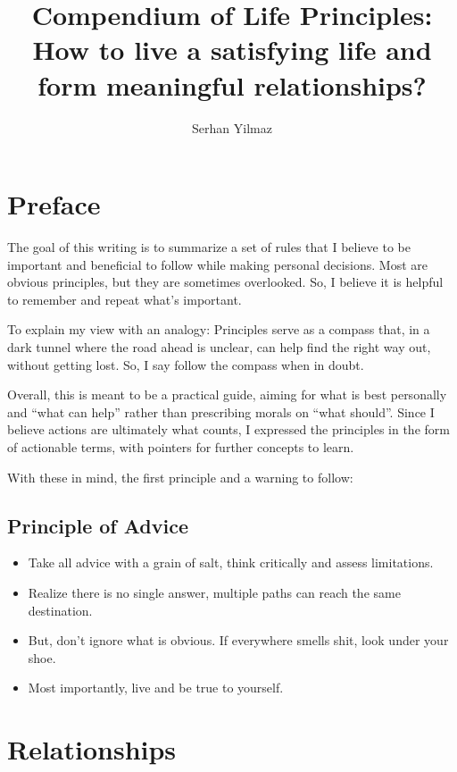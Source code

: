 \documentclass[
]{book}
\title{Compendium of Life Principles: How to live a satisfying life and form meaningful relationships?}
\author{Serhan Yilmaz}
\date{}
\providecommand{\tightlist}{%
  \setlength{\itemsep}{0pt}\setlength{\parskip}{0pt}}
\begin{document}
\maketitle

{
\setcounter{tocdepth}{1}
\tableofcontents
}
\hypertarget{preface}{%
\chapter{Preface}\label{preface}}

The goal of this writing is to summarize a set of rules that I believe to be important and beneficial to follow while making personal decisions. Most are obvious principles, but they are sometimes overlooked. So, I believe it is helpful to remember and repeat what's important.

To explain my view with an analogy: Principles serve as a compass that, in a dark tunnel where the road ahead is unclear, can help find the right way out, without getting lost. So, I say follow the compass when in doubt.

Overall, this is meant to be a practical guide, aiming for what is best personally and ``what can help'' rather than prescribing morals on ``what should''. Since I believe actions are ultimately what counts, I expressed the principles in the form of actionable terms, with pointers for further concepts to learn.

With these in mind, the first principle and a warning to follow:

\hypertarget{principle-of-advice}{%
\section{Principle of Advice}\label{principle-of-advice}}

\begin{itemize}
\tightlist
\item
  Take all advice with a grain of salt, think critically and assess limitations.
\item
  Realize there is no single answer, multiple paths can reach the same destination.
\item
  But, don't ignore what is obvious. If everywhere smells shit, look under your shoe.
\item
  Most importantly, live and be true to yourself.
\end{itemize}

\hypertarget{relationships}{%
\chapter{Relationships}\label{relationships}}
\end{document}
